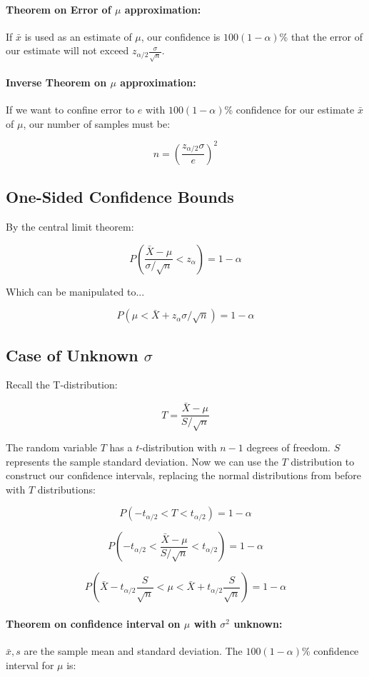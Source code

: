 \documentclass[a4paper,12pt]{report}
\begin{document}
\paragraph{Theorem on Error of $\mu$ approximation: } If $\bar{x}$ is used as an estimate of $\mu$, our confidence is $100(1-\alpha)$\% that the error of our estimate will not exceed $z_{\alpha/2}\frac{\sigma}{\sqrt{n}}$. 

\paragraph{Inverse Theorem on $\mu$ approximation: } If we want to confine error to $e$ with $100(1-\alpha)$\% confidence for our estimate $\bar{x}$ of $\mu$, our number of samples must be: 

$$n = (\frac{z_{\alpha/2} \sigma}{e})^2$$


\subsection{One-Sided Confidence Bounds}

By the central limit theorem: 

$$P(\frac{\bar{X} - \mu}{\sigma/\sqrt{n}} < z_\alpha) = 1 - \alpha$$

Which can be manipulated to...

$$P(\mu < \bar{X} + z_\alpha \sigma / \sqrt{n}) = 1-\alpha$$

\subsection{Case of Unknown $\sigma$}

Recall the T-distribution: 

$$T = \frac{\bar{X} - \mu}{S/\sqrt{n}}$$

The random variable $T$ has a $t$-distribution with $n-1$ degrees of freedom. $S$ represents the sample standard deviation. Now we can use the $T$ distribution to construct our confidence intervals, replacing the normal distributions from before with $T$ distributions: 

$$P(-t_{\alpha/2} < T < t_{\alpha/2}) = 1-\alpha$$


$$P(-t_{\alpha/2} < \frac{\bar{X} - \mu}{S/\sqrt{n}} < t_{\alpha/2}) = 1-\alpha$$

$$P(\bar{X} - t_{\alpha/2}\frac{S}{\sqrt{n}} < \mu < \bar{X} + t_{\alpha/2}\frac{S}{\sqrt{n}}) = 1-\alpha$$


\paragraph{Theorem on confidence interval on $\mu$ with $\sigma^2$ unknown: } $\bar{x}, s$ are the sample mean and standard deviation. The $100(1-\alpha)$\% confidence interval for $\mu$ is: 
\end{document}
